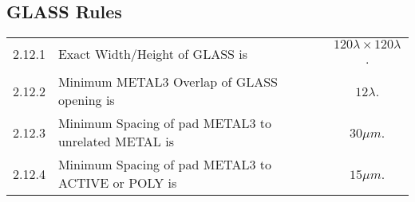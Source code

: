 \subsection{GLASS Rules}\label{design_rules_glass_rules}

\begin{flushleft}
    \begin{tabular}{c l c}
	2.12.1  & Exact Width/Height of GLASS is & $ 120 \lambda \times 120 \lambda$. \\
        2.12.2  & Minimum METAL3 Overlap of GLASS opening is & $ 12 \lambda $. \\
        2.12.3  & Minimum Spacing of pad METAL3 to unrelated METAL is & $30 \mu m$. \\
        2.12.4  & Minimum Spacing of pad METAL3 to ACTIVE or POLY is & $15 \mu m$. \\
    \end{tabular}
\end{flushleft}


